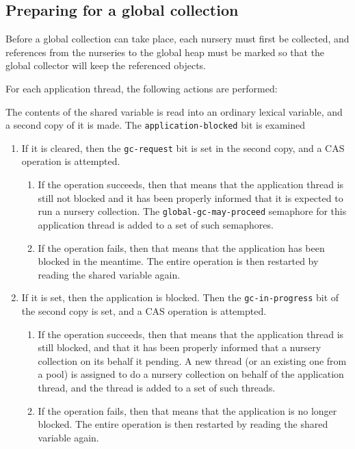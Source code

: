 \subsection{Preparing for a global collection}

Before a global collection can take place, each nursery must first be
collected, and references from the nurseries to the global heap must
be marked so that the global collector will keep the referenced
objects.

For each application thread, the following actions are performed:

The contents of the shared variable is read into an ordinary lexical
variable, and a second copy of it is made.  The
\texttt{application-blocked} bit is examined

\begin{enumerate}
\item If it is cleared, then the \texttt{gc-request} bit is set in the
  second copy, and a CAS operation is attempted.
  \begin{enumerate}
  \item If the operation succeeds, then that means that the
    application thread is still not blocked and it has been properly
    informed that it is expected to run a nursery collection.  The
    \texttt{global-gc-may-proceed} semaphore for this application
    thread is added to a set of such semaphores.
  \item If the operation fails, then that means that the application
    has been blocked in the meantime.  The entire operation is then
    restarted by reading the shared variable again.
  \end{enumerate}
\item If it is set, then the application is blocked.  Then the
  \texttt{gc-in-progress} bit of the second copy is set, and a CAS
  operation is attempted.
  \begin{enumerate}
  \item If the operation succeeds, then that means that the
    application thread is still blocked, and that it has been properly
    informed that a nursery collection on its behalf it pending.  A
    new thread (or an existing one from a pool) is assigned to do a
    nursery collection on behalf of the application thread, and the
    thread is added to a set of such threads.
    \item If the operation fails, then that means that the application
      is no longer blocked.  The entire operation is then restarted by
      reading the shared variable again.
  \end{enumerate}
\end{enumerate}

